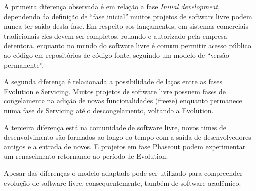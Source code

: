 A primeira diferença observada é em relação a fase {\it Initial development},
dependendo da definição de ``fase inicial'' muitos projetos de software livre
podem nunca ter saído desta fase. Em respeito aos lançamentos,
em sistemas comerciais tradicionais eles devem ser completos, rodando e autorizado
pela empresa detentora, enquanto no mundo do software livre é comum
permitir acesso público ao código em repositórios de código fonte, seguindo
um modelo de ``versão permanente''.

A segunda diferença é relacionada a possibilidade de laços entre
as fases Evolution e Servicing. Muitos projetos de software livre
possuem fases de congelamento na adição de novas funcionalidades (freeze)
enquanto permanece numa fase de Servicing até o descongelamento, voltando
a Evolution.

A terceira diferença está na comunidade de software livre,
novos times de desenvolvimento são formados ao longo do tempo
com a saída de desenvolvedores antigos e a entrada de novos.
E projetos em fase Phaseout podem experimentar um renascimento
retornando ao período de Evolution.

Apesar das diferenças o modelo adaptado pode ser utilizado para
compreender evolução de software livre, consequentemente, também
de software acadêmico.
